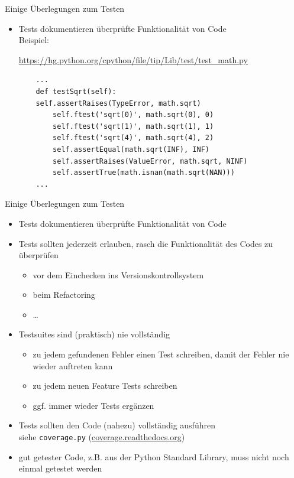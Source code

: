 \documentclass[t, utf8x, 10pt]{beamer}
\begin{document}
\begin{frame}[fragile]{Einige Überlegungen zum Testen}
 \begin{itemize}
  \item Tests dokumentieren überprüfte Funktionalität von Code\\[0.2truecm]
	  Beispiel: \parbox[t]{0.7\textwidth}{\url{https://hg.python.org/cpython/file/tip/Lib/test/test\_math.py}}
    \begin{lstlisting}
    ...
    def testSqrt(self):
	self.assertRaises(TypeError, math.sqrt)
        self.ftest('sqrt(0)', math.sqrt(0), 0)
        self.ftest('sqrt(1)', math.sqrt(1), 1)
        self.ftest('sqrt(4)', math.sqrt(4), 2)
        self.assertEqual(math.sqrt(INF), INF)
        self.assertRaises(ValueError, math.sqrt, NINF)
        self.assertTrue(math.isnan(math.sqrt(NAN)))
    ...
    \end{lstlisting}
 \end{itemize}
\end{frame}


\begin{frame}[fragile]{Einige Überlegungen zum Testen}
 \begin{itemize}
  \item Tests dokumentieren überprüfte Funktionalität von Code
  \item Tests sollten jederzeit erlauben, rasch die Funktionalität des Codes zu überprüfen
	\begin{itemize}
         \item vor dem Einchecken ins Versionskontrollsystem
	 \item beim Refactoring
	 \item \dots
	\end{itemize}
  \item Testsuites sind (praktisch) nie vollständig
	\begin{itemize}
	 \item zu jedem gefundenen Fehler einen Test schreiben, damit der Fehler nie
	       wieder auftreten kann
	 \item zu jedem neuen Feature Tests schreiben
         \item ggf. immer wieder Tests ergänzen
	\end{itemize}
  \item Tests sollten den Code (nahezu) vollständig ausführen\\
        siehe \texttt{coverage.py} (\url{coverage.readthedocs.org})
  \item gut getester Code, z.B. aus der Python Standard Library, muss nicht noch einmal
        getestet werden
 \end{itemize}
\end{frame}
\end{document}

